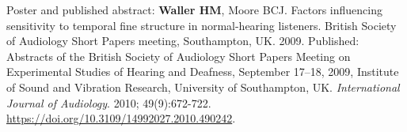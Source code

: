 \documentclass[a4paper, oneside, final, 11pt]{scrartcl} %
\begin{document}
\bigskip

Poster and published abstract: \textbf{Waller HM}, Moore BCJ. Factors influencing sensitivity to temporal fine structure in normal-hearing listeners. British Society of Audiology Short Papers meeting, Southampton, UK. 2009. Published: Abstracts of the British Society of Audiology Short Papers Meeting on Experimental Studies of Hearing and Deafness, September 17--18, 2009, Institute of Sound and Vibration Research, University of Southampton, UK. \textit{International Journal of Audiology}. 2010; 49(9):672-722. \\\url{https://doi.org/10.3109/14992027.2010.490242}.
\end{document}
